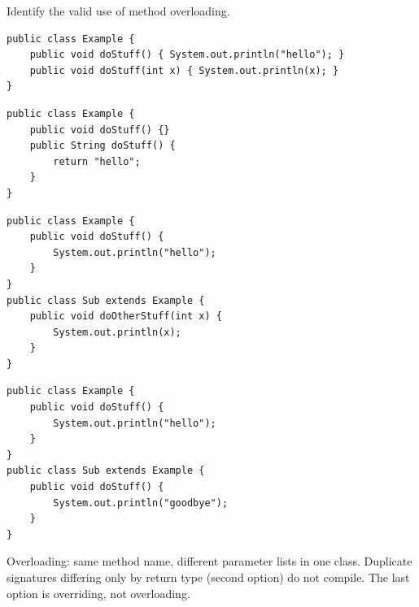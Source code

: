 \question[4]
Identify the valid use of method overloading.
\begin{choices}
  \CorrectChoice
  \begin{minipage}[t]{0.88\linewidth}
\begin{lstlisting}[style=java]
public class Example {
    public void doStuff() { System.out.println("hello"); }
    public void doStuff(int x) { System.out.println(x); }
}
\end{lstlisting}
  \end{minipage}
  \choice
  \begin{minipage}[t]{0.88\linewidth}
\begin{lstlisting}[style=java]
public class Example {
    public void doStuff() {}
    public String doStuff() {
        return "hello";
    }
}
\end{lstlisting}
  \end{minipage}
  \choice
  \begin{minipage}[t]{0.88\linewidth}
\begin{lstlisting}[style=java]
public class Example {
    public void doStuff() {
        System.out.println("hello");
    }
}
public class Sub extends Example {
    public void doOtherStuff(int x) {
        System.out.println(x);
    }
}
\end{lstlisting}
  \end{minipage}
  \choice
  \begin{minipage}[t]{0.88\linewidth}
\begin{lstlisting}[style=java]
public class Example {
    public void doStuff() {
        System.out.println("hello");
    }
}
public class Sub extends Example {
    public void doStuff() {
        System.out.println("goodbye");
    }
}
\end{lstlisting}
  \end{minipage}
\end{choices}
\begin{solution}
  Overloading: same method name, different parameter lists in one class. Duplicate signatures differing only by return type (second option) do not compile. The last option is overriding, not overloading.
\end{solution}

\newpage


